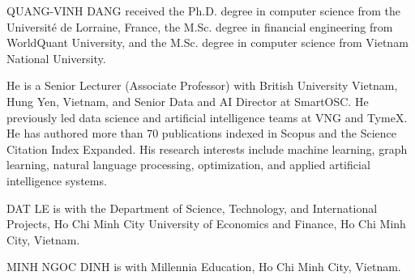 \begin{IEEEbiographynophoto}{QUANG-VINH DANG} received the Ph.D. degree in computer science from the Universit\'e de Lorraine, France, the M.Sc. degree in financial engineering from WorldQuant University, and the M.Sc. degree in computer science from Vietnam National University.

He is a Senior Lecturer (Associate Professor) with British University Vietnam, Hung Yen, Vietnam, and Senior Data and AI Director at SmartOSC. He previously led data science and artificial intelligence teams at VNG and TymeX. He has authored more than 70 publications indexed in Scopus and the Science Citation Index Expanded. His research interests include machine learning, graph learning, natural language processing, optimization, and applied artificial intelligence systems.
\end{IEEEbiographynophoto}

\begin{IEEEbiographynophoto}{DAT LE} is with the Department of Science, Technology, and International Projects, Ho Chi Minh City University of Economics and Finance, Ho Chi Minh City, Vietnam.
\end{IEEEbiographynophoto}

\begin{IEEEbiographynophoto}{MINH NGOC DINH} is with Millennia Education, Ho Chi Minh City, Vietnam.
\end{IEEEbiographynophoto}
